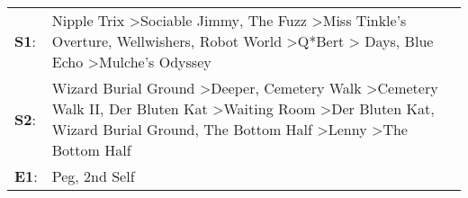 \begin{supertabular}{p{0.03\textwidth}p{0.92\textwidth}}
 \textbf{S1}:  &                                                                              Nipple Trix\textsuperscript{} \textgreater \enspace Sociable Jimmy\textsuperscript{}, \enspace The Fuzz\textsuperscript{} \textgreater \enspace Miss Tinkle's Overture\textsuperscript{}, \enspace Wellwishers\textsuperscript{}, \enspace Robot World\textsuperscript{} \textgreater \enspace Q*Bert\textsuperscript{} \textgreater {} Days\textsuperscript{}, \enspace Blue Echo\textsuperscript{} \textgreater \enspace Mulche's Odyssey\textsuperscript{}  \enspace  \\
 \textbf{S2}:  &  Wizard Burial Ground\textsuperscript{} \textgreater \enspace Deeper\textsuperscript{}, \enspace Cemetery Walk\textsuperscript{} \textgreater \enspace Cemetery Walk II\textsuperscript{}, \enspace Der Bluten Kat\textsuperscript{} \textgreater \enspace Waiting Room\textsuperscript{} \textgreater \enspace Der Bluten Kat\textsuperscript{}, \enspace Wizard Burial Ground\textsuperscript{}, \enspace The Bottom Half\textsuperscript{} \textgreater \enspace Lenny\textsuperscript{} \textgreater \enspace The Bottom Half\textsuperscript{}  \enspace  \\
 \textbf{E1}:  &                                                                                                                                                                                                                                                                                                                                                                                                                                                                                          Peg\textsuperscript{}, \enspace 2nd Self\textsuperscript{}  \enspace  \\
\end{supertabular}
